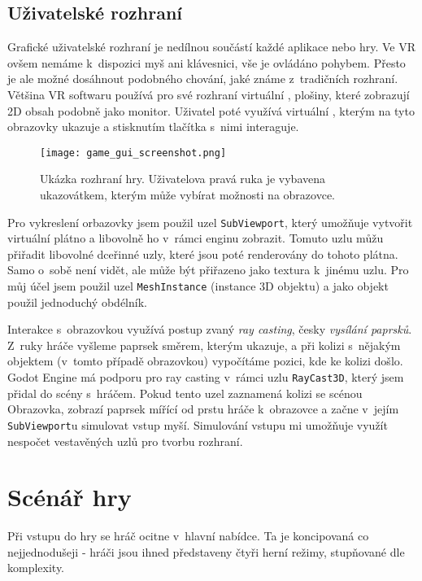 \label{uzivatelske_rozhrani}
\section{Uživatelské rozhraní}

Grafické uživatelské rozhraní je nedílnou součástí každé aplikace nebo hry. Ve VR ovšem nemáme k~dispozici myš ani klávesnici, vše je ovládáno pohybem. Přesto je ale možné dosáhnout podobného chování, jaké známe z~tradičních rozhraní. Většina VR softwaru používá pro své rozhraní virtuální , plošiny, které zobrazují 2D obsah podobně jako monitor. Uživatel poté využívá virtuální , kterým na tyto obrazovky ukazuje a stisknutím tlačítka s~nimi interaguje.

\begin{figure}[H]
  \centering
  \texttt{[image: game\_gui\_screenshot.png]}
  \caption{Ukázka rozhraní hry. Uživatelova pravá ruka je vybavena ukazovátkem, kterým může vybírat možnosti na obrazovce.}
  \label{game_gui_screenshot}
\end{figure}

Pro vykreslení orbazovky jsem použil uzel \texttt{SubViewport}, který umožňuje vytvořit virtuální plátno a libovolně ho v~rámci enginu zobrazit. Tomuto uzlu můžu přiřadit libovolné dceřinné uzly, které jsou poté renderovány do tohoto plátna. Samo o~sobě není vidět, ale může být přiřazeno jako textura k~jinému uzlu. Pro můj účel jsem použil uzel \texttt{MeshInstance} (instance 3D objektu) a jako objekt použil jednoduchý obdélník.

Interakce s~obrazovkou využívá postup zvaný \textit{ray casting}, česky \textit{vysílání paprsků}. Z~ruky hráče vyšleme paprsek směrem, kterým ukazuje, a při kolizi s~nějakým objektem (v~tomto případě obrazovkou) vypočítáme pozici, kde ke kolizi došlo. Godot Engine má podporu pro ray casting v~rámci uzlu \texttt{RayCast3D}, který jsem přidal do scény s~hráčem. Pokud tento uzel zaznamená kolizi se scénou Obrazovka, zobrazí paprsek mířící od prstu hráče k~obrazovce a začne v~jejím \texttt{SubViewport}u simulovat vstup myší. Simulování vstupu mi umožňuje využít nespočet vestavěných uzlů pro tvorbu rozhraní.

\chapter{Scénář hry}

Při vstupu do hry se hráč ocitne v~hlavní nabídce. Ta je koncipovaná co nejjednodušeji - hráči jsou ihned představeny čtyři herní režimy, stupňované dle komplexity.

